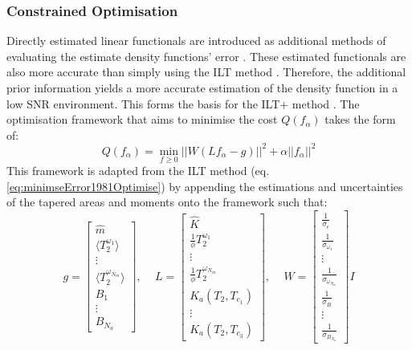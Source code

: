\subsubsection{Constrained Optimisation}
    Directly estimated linear functionals are introduced as additional methods of evaluating the estimate density functions' error \cite{GruberT2Estimation2013}. These estimated functionals are also more accurate than simply using the ILT method \cite{GruberLinearFunctionals2013}. Therefore, the additional prior information yields a more accurate estimation of the density function in a low SNR environment. This forms the basis for the ILT+ method \cite{GruberT2Estimation2013}. The optimisation framework that aims to minimise the cost $Q(f_\alpha)$ takes the form of:
\begin{equation}
    Q(f_\alpha) = \min_{f\geq0}  ||W(Lf_\alpha - g)||^2 + \alpha||f_\alpha||^2
    \label{eq:2013Optimise}    
\end{equation}
    This framework is adapted from the ILT method (eq. \ref{eq:minimseError1981Optimise}) by appending the estimations and uncertainties of the tapered areas and moments onto the framework \cite{GruberT2Estimation2013} such that:
 \begin{equation}
    g = 
    \begin{bmatrix}
    \hat{m}  \\
    \langle T_2^{\omega_1} \rangle \\
    \vdots \\
    \langle T_2^{\omega_{N_{m}}} \rangle \\
    B_1 \\
    \vdots \\
    B_{N_{a}}
    \end{bmatrix}
    \text{, } \quad
    L = 
    \begin{bmatrix}
    \hat{K}  \\
    \frac{1}{\phi}T_{2}^{\omega_1}\\
    \vdots \\
    \frac{1}{\phi}T_{2}^{\omega_{N_{m}}}\\    
    K_{a}(T_2,T_{c_{1}}) \\
    \vdots \\
    K_{a}(T_2,T_{c_{3}})     
    \end{bmatrix}
    \text{, } \quad
    W = 
    \begin{bmatrix}
    \frac{1}{\sigma_\epsilon}  \\
    \frac{1}{\sigma_{\omega_1}}  \\ 
    \vdots \\
    \frac{1}{\sigma_{\omega_{N_{m}}}} \\
    \frac{1}{\sigma_B}\\
    \vdots\\
    \frac{1}{\sigma_{B_{N_{a}}}}
    \end{bmatrix}
    I
    \label{eq:2013NewOptVectors}  
\end{equation}    


